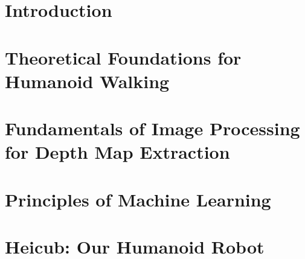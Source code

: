 \documentclass  [
paper    = a4,
BCOR     = 10mm,
twoside,
fontsize = 12pt,
toc      = bibnumbered,
toc      = listofnumbered,
numbers  = noendperiod,
headings = normal,
listof   = leveldown,
version  = 3.03
]                                       {scrreprt}
\begin{document}
	
	
	\tableofcontents
	
	\chapter{Introduction}
	
	
	\chapter{Theoretical Foundations for Humanoid Walking}

	\chapter{Fundamentals of Image Processing for Depth Map Extraction}
	
	\chapter{Principles of Machine Learning}

	\chapter{Heicub: Our Humanoid Robot}
	
\end{document}
